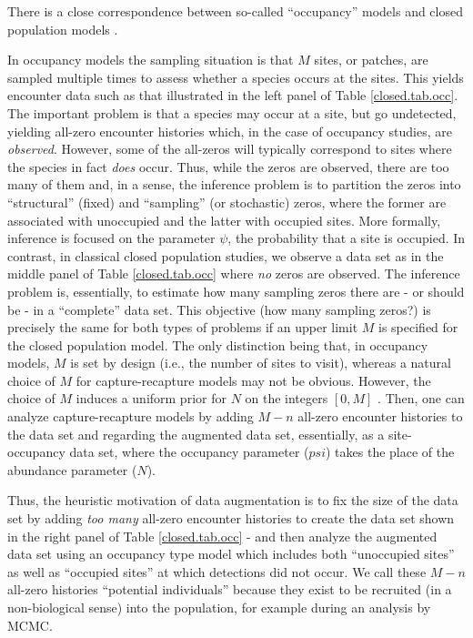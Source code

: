 There is a close correspondence between so-called ``occupancy'' models and closed
population models \citet[see][sec. 5.6]{royle_dorazio:2008}.

In occupancy models \citep{mackenzie_etal:2002, tyre_etal:2003} the
sampling situation is that $M$ sites, or patches, are sampled multiple
times to assess whether a species occurs at the sites.  This yields
encounter data such as that illustrated in the left panel of Table
\ref{closed.tab.occ}. The important problem is that a species may
occur at a site, but go undetected, yielding all-zero encounter
histories which, in the case of occupancy studies, are {\it
  observed}. However, some of the all-zeros will typically correspond
to sites where the species in fact {\it does} occur. Thus, while the
zeros are observed, there are too many of them and, in a sense, the
inference problem is to partition the zeros into ``structural''
(fixed) and ``sampling'' (or stochastic) zeros, where the former are
associated with unoccupied and the latter with occupied sites. More
formally, inference is focused on the parameter $\psi$, the
probability that a site is occupied.  In contrast, in classical closed
population studies, we observe a data set as in the middle panel of
Table \ref{closed.tab.occ} where {\it no} zeros are observed. The
inference problem is, essentially, to estimate how many sampling zeros
there are - or should be - in a ``complete'' data set. This objective
(how many sampling zeros?) is precisely the same for both types of
problems if an upper limit $M$ is specified for the closed population
model. The only distinction being that, in occupancy models, $M$ is
set by design (i.e., the number of sites to visit), whereas a natural
choice of $M$ for capture-recapture models may not be
obvious. However, the choice of $M$ induces a uniform prior for $N$ on
the integers $[0,M]$ \citep{royle_etal:2007}. Then, one can analyze
capture-recapture models by adding $M-n$ all-zero encounter histories
to the data set and regarding the augmented data set, essentially, as
a site-occupancy data set, where the occupancy parameter ($psi$) takes
the place of the abundance parameter ($N$).

Thus, the heuristic motivation of data augmentation is to fix the size
of the data set by adding {\it too many} all-zero encounter histories
to create the data set shown in the right panel of Table
\ref{closed.tab.occ} - and then analyze the augmented data set using an
occupancy type model which includes both ``unoccupied sites'' as well
as ``occupied sites'' at which detections did not occur. We call these
$M-n$ all-zero histories ``potential individuals'' because they exist
to be recruited (in a non-biological sense) into the population, for
example during an analysis by MCMC.


